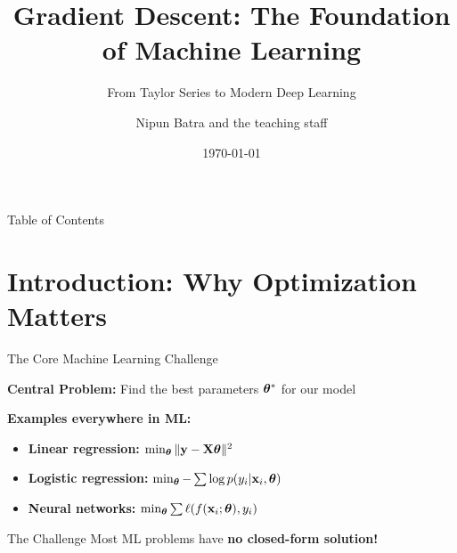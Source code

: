 \documentclass[usenames,dvipsnames]{beamer}
\title{Gradient Descent: The Foundation of Machine Learning}
\subtitle{From Taylor Series to Modern Deep Learning}
\date{\today}
\author{Nipun Batra and the teaching staff}
\institute{IIT Gandhinagar}
\begin{document}
  \maketitle

  \begin{frame}{Table of Contents}
    \tableofcontents
  \end{frame}

  \section{Introduction: Why Optimization Matters}
  
  \begin{frame}{The Core Machine Learning Challenge}
    \begin{keypointsbox}
    \textbf{Central Problem:} Find the best parameters $\boldsymbol{\theta}^*$ for our model
    \end{keypointsbox}
    
    \pause
    \textbf{Examples everywhere in ML:}
    \begin{itemize}[<+->]
        \item \textbf{Linear regression:} $\min_{\boldsymbol{\theta}} \|\mathbf{y} - \mathbf{X}\boldsymbol{\theta}\|^2$
        \item \textbf{Logistic regression:} $\min_{\boldsymbol{\theta}} -\sum \log p(y_i|\mathbf{x}_i, \boldsymbol{\theta})$
        \item \textbf{Neural networks:} $\min_{\boldsymbol{\theta}} \sum \ell(f(\mathbf{x}_i; \boldsymbol{\theta}), y_i)$
    \end{itemize}
    
    \pause
    \begin{alertbox}{The Challenge}
    Most ML problems have \textbf{no closed-form solution!}
    \end{alertbox}
  \end{frame}
\end{document}
